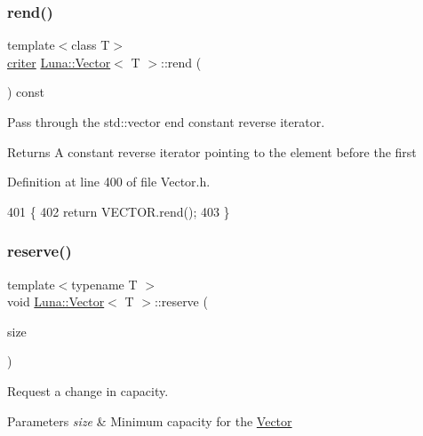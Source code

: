 \subsubsection{\texorpdfstring{rend()}{rend()}\hspace{0.1cm}{\footnotesize\ttfamily [2/2]}}
{\footnotesize\ttfamily template$<$class T$>$ \\
\hyperlink{classLuna_1_1Vector_a66e997f05169640055703449672be075}{criter} \hyperlink{classLuna_1_1Vector}{Luna\+::\+Vector}$<$ T $>$\+::rend (\begin{DoxyParamCaption}{ }\end{DoxyParamCaption}) const\hspace{0.3cm}{\ttfamily [inline]}}



Pass through the std\+::vector end constant reverse iterator. 

\begin{DoxyReturn}{Returns}
A constant reverse iterator pointing to the element before the first 
\end{DoxyReturn}


Definition at line 400 of file Vector.\+h.


\begin{DoxyCode}
401     \{
402       \textcolor{keywordflow}{return} VECTOR.rend();
403     \}
\end{DoxyCode}
\mbox{\label{classLuna_1_1Vector_ae0f59108f43c00b44a12aef3c722fb1d}} 
\subsubsection{\texorpdfstring{reserve()}{reserve()}}
{\footnotesize\ttfamily template$<$typename T $>$ \\
void \hyperlink{classLuna_1_1Vector}{Luna\+::\+Vector}$<$ T $>$\+::reserve (\begin{DoxyParamCaption}\item[{const std\+::size\+\_\+t \&}]{size }\end{DoxyParamCaption})\hspace{0.3cm}{\ttfamily [inline]}}



Request a change in capacity. 


\begin{DoxyParams}{Parameters}
{\em size} & Minimum capacity for the \hyperlink{classLuna_1_1Vector}{Vector} \\
\hline
\end{DoxyParams}


